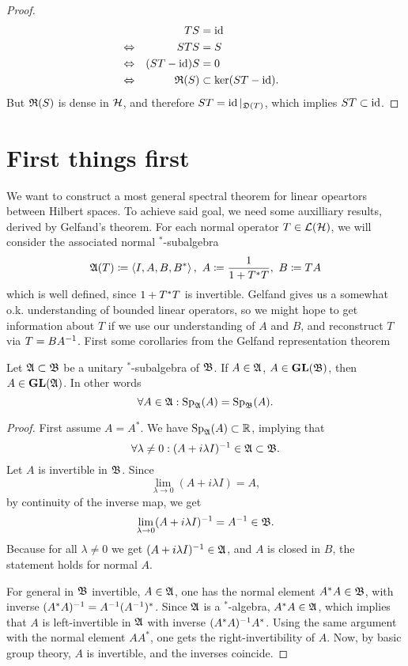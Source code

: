 \documentclass[a4paper,10pt]{article}
\begin{document}
\begin{proof}
 \begin{align*}
 &\quad & TS &= \operatorname{id} &\\
 &\Leftrightarrow & STS &= S &\\
 &\Leftrightarrow & (ST - \operatorname{id})S &= 0 &\\
 &\Leftrightarrow & \mathfrak{R}(S) &\subset \ker(ST - \operatorname{id}). & 
\end{align*}
 But $\mathfrak{R}(S)$ is dense in $\mathcal{H}$, and therefore $ST = \operatorname{id}|_{\mathfrak{D}(T)}$, which implies $ST \subset \operatorname{id}$.
\end{proof}




\section{First things first}
We want to construct a most general spectral theorem for linear opeartors between Hilbert spaces. To achieve said goal, we need some auxilliary results, derived by Gelfand's theorem. For each normal operator $T \in \mathcal{L}(\mathcal{H})$, we will consider the associated normal $^*$-subalgebra 
\[
 \mathfrak{A}(T) \coloneqq \left\langle I, A, B, B^* \right\rangle,~ A \coloneqq \frac{1}{1 + T ^{*} T}, ~ B \coloneqq TA
\]
which is well defined, since $1 + T ^{*} T$ is invertible. Gelfand gives us a somewhat o.k. understanding of bounded linear operators, so we might hope to get information about $T$ if we use our understanding of $A$ and $B$, and reconstruct $T$ via $T = BA^{-1}$.
\newline First some corollaries from the Gelfand representation theorem
\begin{prop}
 Let $\mathfrak{A} \subset \mathfrak{B}$ be a unitary $^*$-subalgebra of $\mathfrak{B}$. If $A \in \mathfrak{A}$, $A \in \operatorname{\mathbf{GL}}(\mathfrak{B})$, then $A \in \operatorname{\mathbf{GL}}(\mathfrak{A})$. In other words 
\[
  \forall A \in \mathfrak{A}: \operatorname{Sp}_{\mathfrak{A}}(A) = \operatorname{Sp}_{\mathfrak{B}}(A).
\]

\end{prop}
\begin{proof}
 First assume $A = A^* $. We have $\operatorname{Sp}_{\mathfrak{A}}(A) \subset \mathbb{R}$, implying that
 \[
  \forall \lambda \neq 0: (A + i \lambda I)^{-1} \in \mathfrak{A} \subset \mathfrak{B}.
 \]
 Let $A$ is invertible in $\mathfrak{B}$. Since 
 \[
  \lim_{\lambda \to 0} (A + i \lambda I) = A,
 \]
 by continuity of the inverse map, we get
 \[
  \lim_{\lambda \to 0} (A + i \lambda I) ^{-1} =A ^{-1} \in \mathfrak{B}.
 \]
Because for all $\lambda \neq 0$ we get $ (A + i \lambda I)^{-1} \in \mathfrak{A}$, and $A$ is closed in $B$, the statement  holds for normal $A$. 

For general in $\mathfrak{B}$ invertible, $A \in \mathfrak{A}$, one has the normal element $A^{*} A \in \mathfrak{B}$, with inverse $(A^{*} A)^{-1} = A^{-1} (A^{-1})^*$. Since $\mathfrak{A}$ is a $^*$-algebra, $A^{*} A \in \mathfrak{A}$, which implies that $A$ is left-invertible in $\mathfrak{A}$ with inverse $(A^{*} A)^{-1} A^*$. Using the same argument with the normal element $AA^*$, one gets the right-invertibility of $A$. Now, by basic group theory, $A$ is invertible, and the inverses coincide.
\end{proof}
\end{document}
